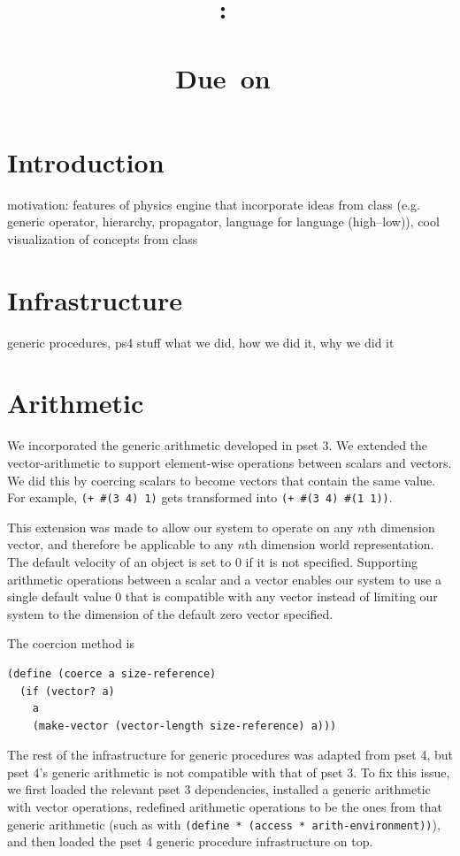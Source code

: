 \documentclass{article}
\title{
    \textmd{\hmwkClass:\ \hmwkTitle}\\
    \normalsize{\hmwkClassInstructor}\\
    \small{Due\ on\ \hmwkDueDate}
}
\author{\hmwkAuthorName}
\date{}
\begin{document}
\maketitle
\section{Introduction}
motivation: features of physics engine that incorporate ideas from class (e.g. generic operator, hierarchy, propagator, language for language (high--low)), cool visualization of concepts from class

\section{Infrastructure}
generic procedures, ps4 stuff
what we did, how we did it, why we did it

\section{Arithmetic}
We incorporated the generic arithmetic developed in pset 3. We extended the vector-arithmetic to support element-wise operations between scalars and vectors. We did this by coercing scalars to become vectors that contain the same value. For example, \texttt{(+ \#(3 4) 1)} gets transformed into \texttt{(+ \#(3 4) \#(1 1))}. 

This extension was made to allow our system to operate on any $n$th dimension vector, and therefore be applicable to any $n$th dimension world representation. The default velocity of an object is set to 0 if it is not specified. Supporting arithmetic operations between a scalar and a vector enables our system to use a single default value 0 that is compatible with any vector instead of limiting our system to the dimension of the default zero vector specified.  

The coercion method is 
\begin{verbatim}
(define (coerce a size-reference)
  (if (vector? a)
    a
    (make-vector (vector-length size-reference) a)))
\end{verbatim}
The rest of the infrastructure for generic procedures was adapted from pset 4, but pset 4's generic arithmetic is not compatible with that of pset 3. To fix this issue, we first loaded the relevant pset 3 dependencies, installed a generic arithmetic with vector operations, redefined arithmetic operations to be the ones from that generic arithmetic (such as with \texttt{(define * (access * arith-environment))}), and then loaded the pset 4 generic procedure infrastructure on top.
\end{document}
